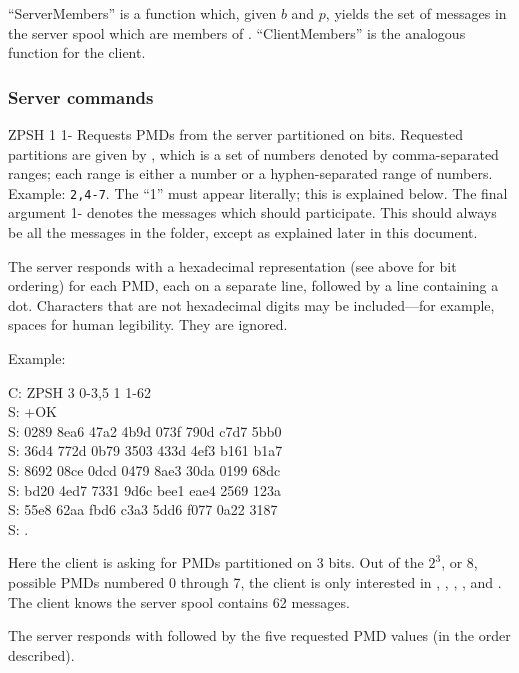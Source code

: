 ``ServerMembers'' is a function which, given $b$ and $p$, yields the
set of messages in the server spool which are members of .
``ClientMembers'' is the analogous function for the client.

\subsubsection{Server commands}

\begin{codelist}
\item[ZPSH \var{b} \var{p} 1 1-\var{n}] Requests PMDs from the
server partitioned on  bits.  Requested partitions are given by
, which is a set of numbers denoted by comma-separated ranges;
each range is either a number or a hyphen-separated range of numbers.
Example: {\tt 2,4-7}.  The ``1'' must appear literally; this is
explained below.  The final argument 1- denotes the messages
which should participate.  This should always be all the messages in
the folder, except as explained later in this document.

The server responds with a hexadecimal representation (see above for
bit ordering) for each PMD, each on a separate line, followed by a
line containing a dot.  Characters that are not hexadecimal digits may
be included---for example, spaces for human legibility.  They are
ignored.

Example:

\begin{conversation}
C: ZPSH 3 0-3,5 1 1-62 \\
S: +OK \\
S: 0289 8ea6 47a2 4b9d 073f 790d c7d7 5bb0 \\
S: 36d4 772d 0b79 3503 433d 4ef3 b161 b1a7 \\
S: 8692 08ce 0dcd 0479 8ae3 30da 0199 68dc \\
S: bd20 4ed7 7331 9d6c bee1 eae4 2569 123a \\
S: 55e8 62aa fbd6 c3a3 5dd6 f077 0a22 3187 \\
S: .
\end{conversation}

Here the client is asking for PMDs partitioned on 3 bits.  Out of the
$2^3$, or 8, possible PMDs numbered 0 through 7, the client is only
interested in , , , , and
.  The client knows the server spool contains 62 messages.

The server responds with  followed by the five requested PMD
values (in the order described).


\end{codelist}
